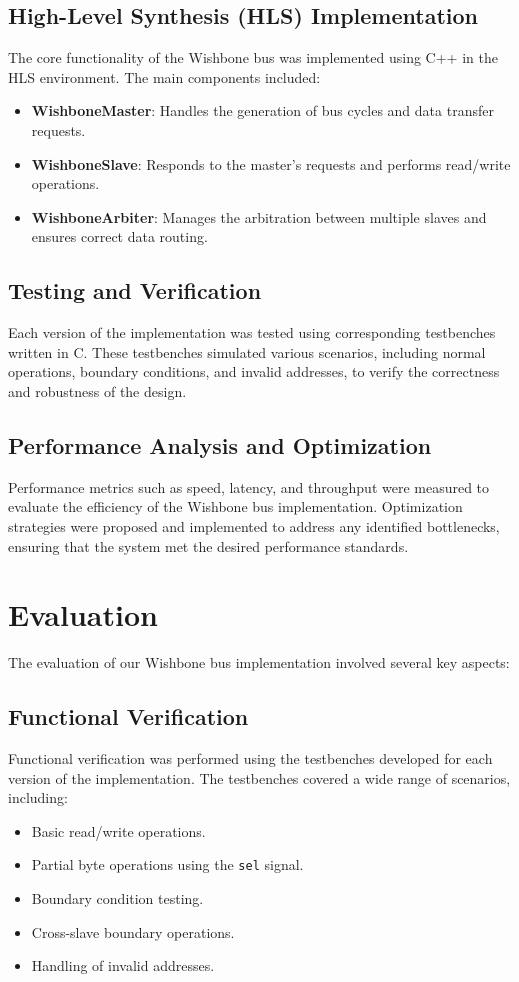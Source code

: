 \documentclass[12pt]{report}
\begin{document}
\subsection{High-Level Synthesis (HLS) Implementation}
The core functionality of the Wishbone bus was implemented using C++ in the HLS environment. The main components included:
\begin{itemize}
    \item \textbf{WishboneMaster}: Handles the generation of bus cycles and data transfer requests.
    \item \textbf{WishboneSlave}: Responds to the master's requests and performs read/write operations.
    \item \textbf{WishboneArbiter}: Manages the arbitration between multiple slaves and ensures correct data routing.
\end{itemize}

\subsection{Testing and Verification}
Each version of the implementation was tested using corresponding testbenches written in C. These testbenches simulated various scenarios, including normal operations, boundary conditions, and invalid addresses, to verify the correctness and robustness of the design.

\subsection{Performance Analysis and Optimization}
Performance metrics such as speed, latency, and throughput were measured to evaluate the efficiency of the Wishbone bus implementation. Optimization strategies were proposed and implemented to address any identified bottlenecks, ensuring that the system met the desired performance standards.




\section{Evaluation}

The evaluation of our Wishbone bus implementation involved several key aspects:

\subsection{Functional Verification}
Functional verification was performed using the testbenches developed for each version of the implementation. The testbenches covered a wide range of scenarios, including:
\begin{itemize}
    \item Basic read/write operations.
    \item Partial byte operations using the \texttt{sel} signal.
    \item Boundary condition testing.
    \item Cross-slave boundary operations.
    \item Handling of invalid addresses.
\end{itemize}
\end{document}
